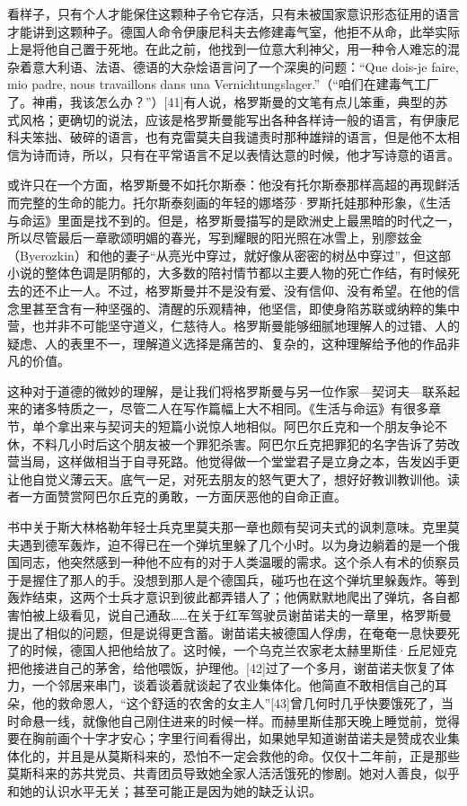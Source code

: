 看样子，只有个人才能保住这颗种子令它存活，只有未被国家意识形态征用的语言才能讲到这颗种子。德国人命令伊康尼科夫去修建毒气室，他拒不从命，此举实际上是将他自己置于死地。在此之前，他找到一位意大利神父，用一种令人难忘的混杂着意大利语、法语、德语的大杂烩语言问了一个深奥的问题：“Que dois-je faire, mio padre, nous travaillons dans una Vernichtungslager.”（“咱们在建毒气工厂了。神甫，我该怎么办？”）[41]有人说，格罗斯曼的文笔有点儿笨重，典型的苏式风格；更确切的说法，应该是格罗斯曼能写出各种各样诗一般的语言，有伊康尼科夫笨拙、破碎的语言，也有克雷莫夫自我谴责时那种雄辩的语言，但是他不太相信为诗而诗，所以，只有在平常语言不足以表情达意的时候，他才写诗意的语言。

或许只在一个方面，格罗斯曼不如托尔斯泰：他没有托尔斯泰那样高超的再现鲜活而完整的生命的能力。托尔斯泰刻画的年轻的娜塔莎·罗斯托娃那种形象，《生活与命运》里面是找不到的。但是，格罗斯曼描写的是欧洲史上最黑暗的时代之一，所以尽管最后一章歌颂明媚的春光，写到耀眼的阳光照在冰雪上，别廖兹金（Byerozkin）和他的妻子“从亮光中穿过，就好像从密密的树丛中穿过”，但这部小说的整体色调是阴郁的，大多数的陪衬情节都以主要人物的死亡作结，有时候死去的还不止一人。不过，格罗斯曼并不是没有爱、没有信仰、没有希望。在他的信念里甚至含有一种坚强的、清醒的乐观精神，他坚信，即使身陷苏联或纳粹的集中营，也并非不可能坚守道义，仁慈待人。格罗斯曼能够细腻地理解人的过错、人的疑虑、人的表里不一，理解道义选择是痛苦的、复杂的，这种理解给予他的作品非凡的价值。

这种对于道德的微妙的理解，是让我们将格罗斯曼与另一位作家—契诃夫—联系起来的诸多特质之一，尽管二人在写作篇幅上大不相同。《生活与命运》有很多章节，单个拿出来与契诃夫的短篇小说惊人地相似。阿巴尔丘克和一个朋友争论不休，不料几小时后这个朋友被一个罪犯杀害。阿巴尔丘克把罪犯的名字告诉了劳改营当局，这样做相当于自寻死路。他觉得做一个堂堂君子是立身之本，告发凶手更让他自觉义薄云天。底气一足，对死去朋友的怒气更大了，想好好教训教训他。读者一方面赞赏阿巴尔丘克的勇敢，一方面厌恶他的自命正直。

书中关于斯大林格勒年轻士兵克里莫夫那一章也颇有契诃夫式的讽刺意味。克里莫夫遇到德军轰炸，迫不得已在一个弹坑里躲了几个小时。以为身边躺着的是一个俄国同志，他突然感到一种他不应有的对于人类温暖的需求。这个杀人有术的侦察员于是握住了那人的手。没想到那人是个德国兵，碰巧也在这个弹坑里躲轰炸。等到轰炸结束，这两个士兵才意识到彼此都弄错人了；他俩默默地爬出了弹坑，各自都害怕被上级看见，说自己通敌……在关于红军驾驶员谢苗诺夫的一章里，格罗斯曼提出了相似的问题，但是说得更含蓄。谢苗诺夫被德国人俘虏，在奄奄一息快要死了的时候，德国人把他给放了。这时候，一个乌克兰农家老太赫里斯佳·丘尼娅克把他接进自己的茅舍，给他喂饭，护理他。[42]过了一个多月，谢苗诺夫恢复了体力，一个邻居来串门，谈着谈着就谈起了农业集体化。他简直不敢相信自己的耳朵，他的救命恩人，“这个舒适的农舍的女主人”[43]曾几何时几乎快要饿死了，当时命悬一线，就像他自己刚住进来的时候一样。而赫里斯佳那天晚上睡觉前，觉得要在胸前画个十字才安心；字里行间看得出，如果她早知道谢苗诺夫是赞成农业集体化的，并且是从莫斯科来的，恐怕不一定会救他的命。仅仅十二年前，正是那些莫斯科来的苏共党员、共青团员导致她全家人活活饿死的惨剧。她对人善良，似乎和她的认识水平无关；甚至可能正是因为她的缺乏认识。

